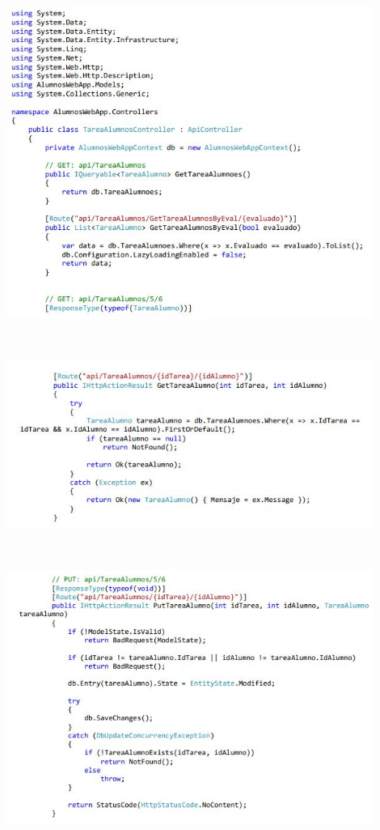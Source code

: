 \begin{flushleft}
\begin{itemize}
\begin{center}
	\includegraphics[width=12cm]{./Imagenes/paso16} 
	\end{center}

\textbf{ }\\

\begin{center}
	\includegraphics[width=12cm]{./Imagenes/paso16-1} 
	\end{center}

\textbf{ }\\

\begin{center}
	\includegraphics[width=12cm]{./Imagenes/paso16-2} 
	\end{center}


\end{itemize}
\end{flushleft}
